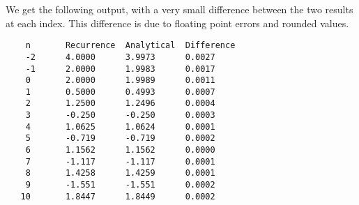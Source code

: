 \documentclass{article}
\begin{document}
We get the following output, with a very small difference between the two results at each index. This difference is due to floating point errors and rounded values.
\begin{verbatim}
    n       Recurrence  Analytical  Difference
    -2      4.0000      3.9973      0.0027
    -1      2.0000      1.9983      0.0017
    0       2.0000      1.9989      0.0011
    1       0.5000      0.4993      0.0007
    2       1.2500      1.2496      0.0004
    3       -0.250      -0.250      0.0003
    4       1.0625      1.0624      0.0001
    5       -0.719      -0.719      0.0002
    6       1.1562      1.1562      0.0000
    7       -1.117      -1.117      0.0001
    8       1.4258      1.4259      0.0001
    9       -1.551      -1.551      0.0002
   10       1.8447      1.8449      0.0002
\end{verbatim}

\end{document}
